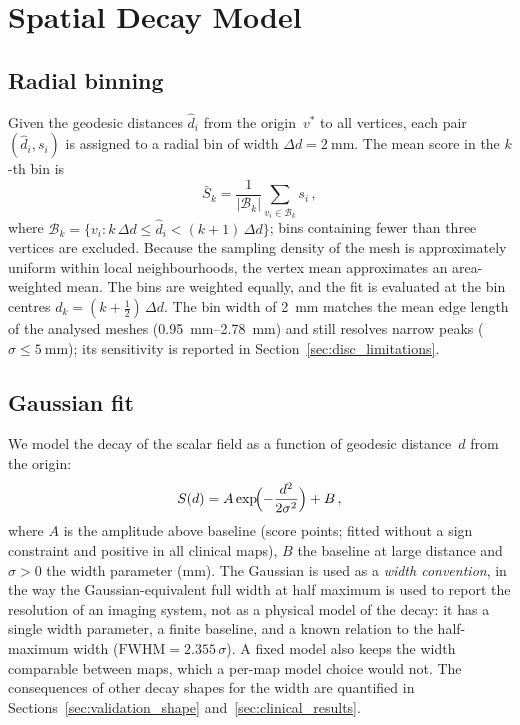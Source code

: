 \documentclass[a4paper,fleqn]{cas-dc}
\begin{document}
\section{Spatial Decay Model}\label{sec:decay}

\subsection{Radial binning}\label{sec:binning}

Given the geodesic distances $\hat{d}_i$ from the origin~$v^*$ to all
vertices, each pair $(\hat{d}_i, s_i)$ is assigned to a radial bin of
width $\Delta d = \SI{2}{\milli\metre}$.  The mean score in the $k$-th
bin is
\begin{equation}
  \bar{S}_k = \frac{1}{|\mathcal{B}_k|}
    \sum_{v_i \in \mathcal{B}_k} s_i\,,
  \label{eq:binning}
\end{equation}
where $\mathcal{B}_k = \{v_i : k\,\Delta d \le \hat{d}_i < (k{+}1)\,\Delta d\}$;
bins containing fewer than three vertices are excluded.  Because the
sampling density of the mesh is approximately uniform within local
neighbourhoods, the vertex mean approximates an area-weighted mean.  The bins are
weighted equally, and the fit is evaluated at the bin centres
$d_k = (k + \tfrac12)\,\Delta d$.  The
bin width of \SI{2}{\milli\metre} matches the mean edge length of the
analysed meshes (\SIrange{0.95}{2.78}{\milli\metre}) and still resolves
narrow peaks ($\sigma \le \SI{5}{\milli\metre}$); its sensitivity is
reported in Section~\ref{sec:disc_limitations}.

\subsection{Gaussian fit}\label{sec:gauss}

We model the decay of the scalar field as a function of geodesic
distance~$d$ from the origin:
\begin{equation}
  S(d) = A \exp\!\Bigl(-\frac{d^2}{2\sigma^2}\Bigr) + B\,,
  \label{eq:gauss}
\end{equation}
where $A$ is the amplitude above baseline (score points; fitted without a
sign constraint and positive in all clinical maps), $B$ the
baseline at large distance and $\sigma > 0$ the width parameter (mm).
The Gaussian is used as a \emph{width convention}, in the way the
Gaussian-equivalent full width at half maximum is used to report the
resolution of an imaging system, not as a physical model of the decay:
it has a single width parameter, a finite baseline, and a known relation
to the half-maximum width ($\mathrm{FWHM} = 2.355\,\sigma$).  A fixed
model also keeps the width comparable between maps, which a per-map
model choice would not.  The
consequences of other decay shapes for the width are quantified in
Sections~\ref{sec:validation_shape} and~\ref{sec:clinical_results}.
\end{document}
